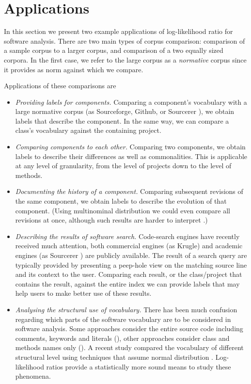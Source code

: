 \documentclass[10pt]{book}
\begin{document}
\section{Applications}\label{applications}

In this section we present two example applications of log-likelihood ratio for software analysis.
There are two main types of corpus comparison: comparison of a sample corpus to a larger corpus, and comparison of a two equally sized corpora. In the first case, we refer to the large corpus as a \emph{normative} corpus since it provides as norm against which we compare.

Applications of these comparisons are
\begin{itemize}
\item \emph{Providing labels for components.} Comparing a component's vocabulary with a large normative corpus (as \eg Sourceforge, Github, or Sourcerer \cite{Bajrach09SUITE}), we obtain labels that describe the component. In the same way, we can compare a class's vocabulary against the containing project.
\item \emph{Comparing components to each other.} Comparing two components, we obtain labels to describe their differences as well as commonalities. This is applicable at any level of granularity, from the level of projects down to the level of methods.
\item \emph{Documenting the history of a component.} Comparing subsequent revisions of the same component, we obtain labels to describe the evolution of that component. (Using multinominal distribution we could even compare all revisions at once, although such results are harder to interpret \cite{Dunning}.)
\item \emph{Describing the results of software search.} Code-search engines have recently received much attention, both commercial engines (as \eg Krugle) and academic engines (as \eg Sourcerer \cite{Bajrach09SUITE}) are publicly available. The result of a search query are typically provided by presenting a peep-hole view on the matching source line and its context to the user. Comparing each result, or the class/project that contains the result, against the entire index we can provide labels that may help users to make better use of these results.
\item \emph{Analysing the structural use of vocabulary.} There has been much confusion regarding which parts of the software vocabulary are to be considered in software analysis. Some approaches consider the entire source code including comments, keywords and literals (\eg \cite{Kuhn08b,Kuhn07a}), other approaches consider class and methods names only (\eg \cite{Baldi08OOPSLA,EinarHoest}). A recent study compared the vocabulary of different structural level using techniques that assume normal distribution \cite{Linstead09SUITE}. Log-likelihood ratios provide a statistically more sound means to study these phenomena.
\end{itemize}
\end{document}

